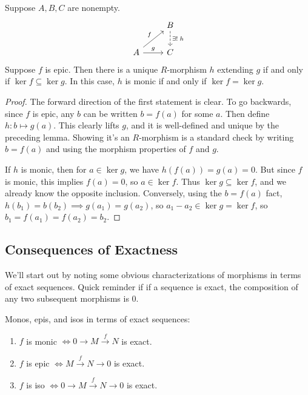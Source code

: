 \documentclass[twoside,10pt]{report}
\begin{document}
\begin{prop}
	\label{prop:unique-ext}
	Suppose $A, B, C$ are nonempty.
	\[
	\begin{tikzcd}
		& B \dar[dashed]{\exists! \; h} \\
		A \arrow[ur, "f"] \rar{g} & C
	\end{tikzcd}
	\] 
	Suppose $f$ is epic. Then there is a unique $R$-morphism $h$ extending $g$ if and only if $\ker f \subseteq \ker g$. In this case, $h$ is monic if and only if $\ker f=\ker g$.
\end{prop}
\begin{proof}
	The forward direction of the first statement is clear. To go backwards, since $f$ is epic, any $b$ can be written $b=f(a)$ for some $a$. Then define $h:b \mapsto g(a)$. This clearly lifts $g$, and it is well-defined and unique by the preceding lemma. Showing it's an $R$-morphism is a standard check by writing $b=f(a)$ and using the morphism properties of $f$ and $g$.

	If $h$ is monic, then for $a \in \ker g$, we have $h(f(a)) = g(a)=0$. But since $f$ is monic, this implies $f(a)=0$, so $a \in \ker f$. Thus $\ker g \subseteq \ker f$, and we already know the opposite inclusion. Conversely, using the $b=f(a)$ fact, $h(b_1)=b(b_2)\implies g(a_1)=g(a_2)$, so $a_1-a_2 \in \ker g = \ker  f$, so $b_1=f(a_1) = f(a_2)=b_2$.
\end{proof}


\subsection{Consequences of Exactness}

We'll start out by noting some obvious characterizations of morphisms in terms of exact sequences. Quick reminder if if a sequence is exact, the composition of any two subsequent morphisms is 0.
\begin{prop}
	Monos, epis, and isos in terms of exact sequences:
\begin{enumerate}
	\item $f$ is monic $\iff 0\to M \stackrel{f}{\to } N$ is exact.
	\item $f$ is epic $\iff M \stackrel{f}{\to } N \to 0$ is exact.
	\item $f$ is iso $\iff 0 \to M \stackrel{f}{\to } N \to 0$ is exact.
\end{enumerate}
\end{prop}
\end{document}
